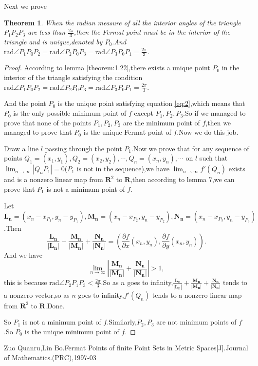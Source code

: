 \documentclass{amsart}
\theoremstyle{plain}
\newtheorem{theorem}{Theorem}
\theoremstyle{definition}
\begin{document}
Next we prove
\begin{theorem}\label{theorem:10}
When the radian  measure of all the interior angles of the triangle
$P_1P_2P_3$ are less than $\frac{2\pi}{3}$,then the Fermat point  must
be  in the interior of the triangle and is unique,denoted by $P_0$.And
$\mbox{rad}\angle P_1P_{0}P_2=\mbox{rad}\angle P_2P_{0}P_3=\mbox{rad}\angle P_3P_{0}P_1=\frac{2\pi}{3}$.
\end{theorem}
\begin{proof}
According to lemma \eqref{theorem:1.22},there exists a unique point
$P_{0}$ in the interior of the triangle  satisfying the condition
$\mbox{rad}\angle P_1P_{0}P_2=\mbox{rad}\angle P_2P_{0}P_3=\mbox{rad}\angle
P_3P_{0}P_1=\frac{2\pi}{3}$.

And the  point $P_0$ is the unique point satisfying equation
\eqref{eq:2},which means that $P_0$ is the only possible minimum point of $f$ except
$P_1,P_2,P_3$.So if we managed to prove that  none of the points $P_1,P_2,P_3$ are
the minimum point of $f$,then we managed to prove that $P_0$ is the unique
Fermat point of $f$.Now we do this job.

Draw a line $l$ passing through the point $P_1$.Now we prove that for any sequence of 
points $Q_1=(x_1,y_1),Q_2=(x_2,y_2),\cdots,Q_n=(x_n,y_n),\cdots$ on
$l$ such that $\lim_{n\to\infty}|Q_nP_1|=0$($P_1$ is not in the sequence),we have
$\lim_{n\to\infty}f'(Q_n)$ exists and is a nonzero linear map from
$\mathbf{R}^2$ to $\mathbf{R}$,then according to lemma 7,we can prove
that $P_1$ is not
a minimum point of $f$.

Let
$\mathbf{L_{n}}=(x_{n}-x_{P_{1}},y_{n}-y_{P_{1}}),\mathbf{M_{n}}=(x_{n}-x_{P_{2}},y_{n}-y_{P_{2}}),\mathbf{N_{n}}=(x_{n}-x_{P_{3}},y_{n}-y_{P_{3}})$.Then
$$
\frac{\mathbf{L_{n}}}{\mathbf{|L_{n}|}}+\frac{\mathbf{M_{n}}}{|\mathbf{M_{n}}|}+\frac{\mathbf{N_{n}}}{\mathbf{|N_{n}|}}=(\frac{\partial f}{\partial x}(x_n,y_n),\frac{\partial f}{\partial y}(x_n,y_n)).
$$
And we have
$$
\lim_{n\to\infty}\left|\frac{\mathbf{M_{n}}}{|\mathbf{M_{n}}|}+\frac{\mathbf{N_{n}}}{|\mathbf{N_{n}}|}\right|>1,
$$
this is because $\mbox{rad}\angle P_2P_1P_3<\frac{2\pi}{3}$.So as $n$
goes to
infinity,$\frac{\mathbf{L_{n}}}{\mathbf{|L_{n}|}}+\frac{\mathbf{M_{n}}}{|\mathbf{M_{n}}|}+\frac{\mathbf{N_{n}}}{\mathbf{|N_{n}|}}$
tends to a nonzero vector,so as $n$ goes to infinity,$f'(Q_n)$ tends
to a nonzero linear map from $\mathbf{R}^2$ to $\mathbf{R}$.Done.

So $P_1$ is not a minimum point of $f$.Similarly,$P_2,P_3$ are not
minimum points of $f$.So $P_0$ is the unique minimum point of $f$.
\end{proof}
\begin{thebibliography}{1}
Zuo Quanru,Lin Bo.Fermat Points of finite Point Sets in
  Metric Spaces[J].Journal of Mathematics.(PRC),1997-03
\end{thebibliography}
\end{document}
